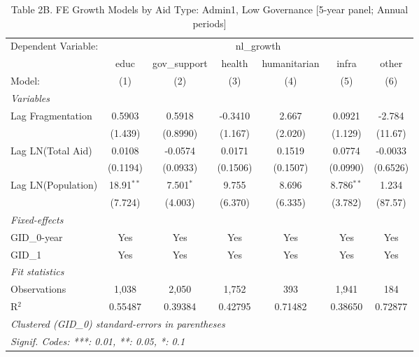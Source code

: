
\begin{table}[H]
   \caption{Table 2B. FE Growth Models by Aid Type: Admin1, Low Governance [5-year panel; Annual periods]}
   \centering
   \begin{tabular}{lcccccc}
      \tabularnewline \midrule \midrule
      Dependent Variable: & \multicolumn{6}{c}{nl\_growth}\\
                         & educ         & gov\_support  & health   & humanitarian & infra        & other \\   
      Model:             & (1)          & (2)           & (3)      & (4)          & (5)          & (6)\\  
      \midrule
      \emph{Variables}\\
      Lag Fragmentation  & 0.5903       & 0.5918        & -0.3410  & 2.667        & 0.0921       & -2.784\\   
                         & (1.439)      & (0.8990)      & (1.167)  & (2.020)      & (1.129)      & (11.67)\\   
      Lag LN(Total Aid)  & 0.0108       & -0.0574       & 0.0171   & 0.1519       & 0.0774       & -0.0033\\   
                         & (0.1194)     & (0.0933)      & (0.1506) & (0.1507)     & (0.0990)     & (0.6526)\\   
      Lag LN(Population) & 18.91$^{**}$ & 7.501$^{*}$   & 9.755    & 8.696        & 8.786$^{**}$ & 1.234\\   
                         & (7.724)      & (4.003)       & (6.370)  & (6.335)      & (3.782)      & (87.57)\\   
      \midrule
      \emph{Fixed-effects}\\
      GID\_0-year        & Yes          & Yes           & Yes      & Yes          & Yes          & Yes\\  
      GID\_1             & Yes          & Yes           & Yes      & Yes          & Yes          & Yes\\  
      \midrule
      \emph{Fit statistics}\\
      Observations       & 1,038        & 2,050         & 1,752    & 393          & 1,941        & 184\\  
      R$^2$              & 0.55487      & 0.39384       & 0.42795  & 0.71482      & 0.38650      & 0.72877\\  
      \midrule \midrule
      \multicolumn{7}{l}{\emph{Clustered (GID\_0) standard-errors in parentheses}}\\
      \multicolumn{7}{l}{\emph{Signif. Codes: ***: 0.01, **: 0.05, *: 0.1}}\\
   \end{tabular}
\end{table}


